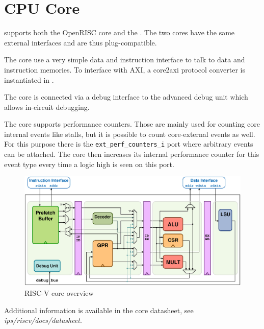 \chapter{CPU Core}

\pulpino supports both the OpenRISC \orion core and the \riscv \rvcore. The two
cores have the same external interfaces and are thus plug-compatible.

The core use a very simple data and instruction interface to talk to data and
instruction memories. To interface with AXI, a core2axi protocol converter is
instantiated in \pulpino.

The core is connected via a debug interface to the advanced debug unit which
allows in-circuit debugging.

The core supports performance counters. Those are mainly used for counting core
internal events like stalls, but it is possible to count core-external events
as well. For this purpose there is the \texttt{ext\_perf\_counters\_i} port where
arbitrary events can be attached. The core then increases its internal
performance counter for this event type every time a logic high is seen on this
port.

\begin{figure}[ht]
  \centering
  \includegraphics[width=\textwidth]{./figures/riscv_overview}
  \caption{RISC-V core overview}
  \label{fig1}
\end{figure}


Additional information is available in the core datasheet, see
\textit{ips/riscv/docs/datasheet}.
